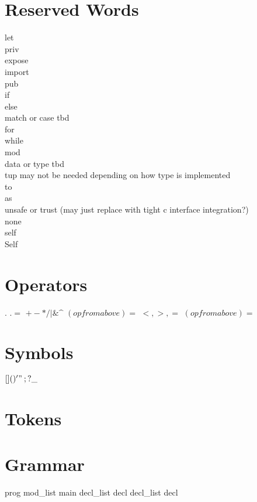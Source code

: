 \documentclass{article}
\begin{document}
	\section{Reserved Words}
		let\\
		priv\\
		expose\\
		import\\
		pub\\
		if\\
		else\\ 
		match or case tbd\\
		for\\
		while\\
		mod\\
		data or type tbd\\
		tup may not be needed depending on how type is implemented\\ 
		to\\
		as\\
		unsafe or trust (may just replace with tight c interface integration?)\\
		none\\
		self\\
		Self\\
	\section{Operators}
		$.$
		$.=$
		$+ - * / | \& \^$
		$(op from above)=$
		$<, >, =$
		$(op from above)=$
	\section{Symbols}
		$[ ]
		( )
		{ }
		' "
		\: ;
		? \_$

	\section{Tokens}
		

	\section{Grammar}
		prog
			mod\_list main 
		decl\_list
			decl decl\_list 
		decl 
\end{document}
